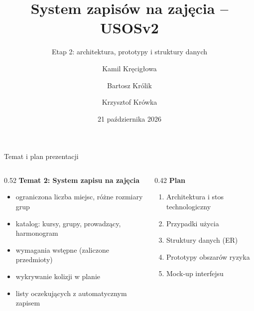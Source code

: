\documentclass[aspectratio=169,11pt]{beamer}
\title{System zapisów na zajęcia -- USOSv2}
\subtitle{Etap 2: architektura, prototypy i struktury danych}
\author{Kamil Kręcigłowa \and Bartosz Królik \and Krzysztof Krówka}
\institute{Inżynieria Oprogramowania, zima 2026/2027}
\date{21 października 2026}
\begin{document}
\maketitle

\begin{frame}{Temat i plan prezentacji}
  \begin{columns}[T]
    \begin{column}{0.52\textwidth}
      \textbf{Temat 2: System zapisu na zajęcia}
      \begin{itemize}\small
        \item ograniczona liczba miejsc, różne rozmiary grup
        \item katalog: kursy, grupy, prowadzący, harmonogram
        \item wymagania wstępne (zaliczone przedmioty)
        \item wykrywanie kolizji w planie
        \item listy oczekujących z automatycznym zapisem
      \end{itemize}
    \end{column}
    \begin{column}{0.42\textwidth}
      \textbf{Plan}
      \begin{enumerate}\small
        \item Architektura i stos technologiczny
        \item Przypadki użycia
        \item Struktury danych (ER)
        \item Prototypy obszarów ryzyka
        \item Mock-up interfejsu
      \end{enumerate}
    \end{column}
  \end{columns}
\end{frame}
\end{document}
